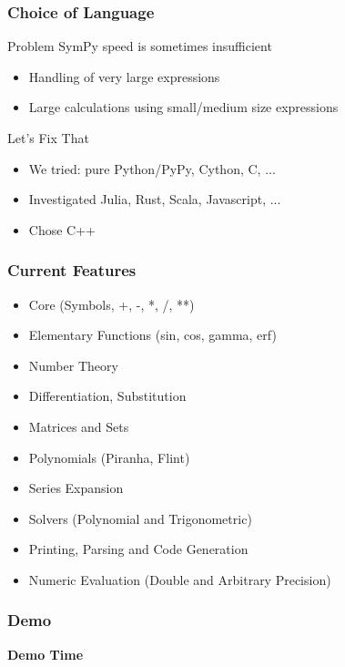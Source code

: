 \documentclass{beamer}
\begin{document}
\begin{frame}
\frametitle{Choice of Language}
\begin{block}{Problem}
SymPy speed is sometimes insufficient
\begin{itemize}
\item Handling of very large expressions
\item Large calculations using small/medium size expressions
\end{itemize}
\end{block}

\begin{block}{Let's Fix That}
\begin{itemize}
\item We tried: pure Python/PyPy, Cython, C, ...
\item Investigated Julia, Rust, Scala, Javascript, ...
\item Chose C++
\end{itemize}
\end{block}
\end{frame}




\begin{frame}
\frametitle{Current Features}
\begin{itemize}
    \item Core (Symbols, +, -, *, /, **)
    \item Elementary Functions (sin, cos, gamma, erf)
    \item Number Theory
    \item Differentiation, Substitution
    \item Matrices and Sets
    \item Polynomials (Piranha, Flint)
    \item Series Expansion
    \item Solvers (Polynomial and Trigonometric)
    \item Printing, Parsing and Code Generation
    \item Numeric Evaluation (Double and Arbitrary Precision)
\end{itemize}
\end{frame}

\begin{frame}
\frametitle{Demo}
{\Large\bf Demo Time}
\end{frame}
\end{document}
